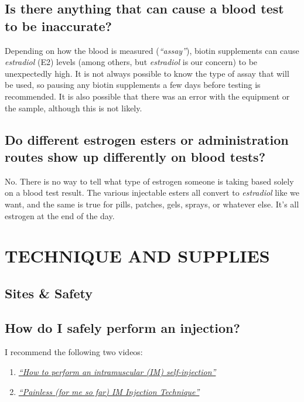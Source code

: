 \documentclass{article}
\begin{document}
\subsection{Is there anything that can cause a blood test to be inaccurate?}

Depending on how the blood is measured (\textit{“assay”}), biotin supplements can cause \textit{estradiol} (E2) levels (among others, but \textit{estradiol} is our concern) to be unexpectedly high. It is not always possible to know the type of assay that will be used, so pausing any biotin supplements a few days before testing is recommended. It is also possible that there was an error with the equipment or the sample, although this is not likely.

\subsection{Do different estrogen esters or administration routes show up differently on blood tests?}\label{4-16}

No. There is no way to tell what type of estrogen someone is taking based solely on a blood test result. The various injectable esters all convert to \textit{estradiol} like we want, and the same is true for pills, patches, gels, sprays, or whatever else. It's all estrogen at the end of the day.



\section{TECHNIQUE AND SUPPLIES}\label{ts}

\subsection*{Sites \& Safety}

\subsection{How do I safely perform an injection?}

I recommend the following two videos:

\begin{enumerate}
  \item \href{https://www.youtube.com/watch?v=cBabaGC2Dok}{\textit{“How to perform an intramuscular (IM) self-injection”}}
  \item \href{https://www.youtube.com/watch?v=YfNlAZLxLyw}{\textit{“Painless (for me so far) IM Injection Technique”}}
\end{enumerate}
\end{document}

